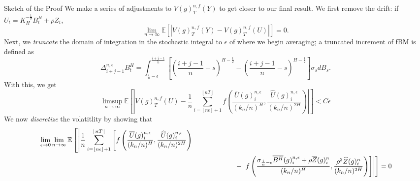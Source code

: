 \documentclass[final,hyperref={pdfpagelabels=false}]{beamer}
\newcommand{\E}{\mathbb{E}}
\begin{document}
\begin{frame}{}
\begin{columns}[t]
\begin{column}{0.4\linewidth}
        \begin{block}{Sketch of the Proof}
          We make a series of adjustments to \(V(g)^{n,f}_T(Y)\) to get closer to our final result. We first remove the drift: if \(U_t = K_H^{-\frac{1}{2}}B^H_t + \rho Z_t\),
          \begin{equation*}
            \lim_{n \rightarrow \infty} \E\left[ \left| V(g)^{n,f}_T(Y) - V(g)^{n,f}_T(U) \right| \right] = 0.
          \end{equation*}
          Next, we \textit{truncate} the domain of integration in the stochastic integral to \(\epsilon\) of where we begin averaging; a truncated increment of fBM is defined as
          \begin{equation*}
            \Delta_{i+j-1}^{n,\epsilon} B^H_t =  \int_{\frac{i}{n}-\epsilon}^{\frac{i+j-1}{n}} \left[ \left( \frac{i+j-1}{n} -s \right)^{H - \frac{1}{2}} - \left( \frac{i+j-1}{n} -s \right)^{H - \frac{1}{2}} \right]\sigma_s dB_s.
          \end{equation*}
          With this, we get
          \begin{equation*}
            \limsup_{n \rightarrow \infty} \E \left[ \left| V(g)^{n,f}_T(U) - \frac{1}{n}\sum_{i=\left\lfloor n\epsilon \right\rfloor + 1}^{\left\lfloor nT \right\rfloor} f\left( \frac{\overline{U}(g)^{n,\epsilon}_i}{(k_n/n)^H}, \frac{\widehat{U}(g)^{n,\epsilon}_i}{(k_n/n)^{2H}} \right) \right| \right] < C\epsilon
          \end{equation*}
          We now \textit{discretize} the volatitlity by showing that
          \begin{align*}
            \phantom{}
            \begin{aligned}
      &\lim_{\epsilon \rightarrow 0}\lim_{n \rightarrow \infty}\E \left[ \left| \frac{1}{n}\sum_{i=\left\lfloor n\epsilon \right\rfloor + 1}^{\left\lfloor nT \right\rfloor} \left[ f\left( \frac{\overline{U}(g)^{n,\epsilon}_i}{(k_n/n)^H}, \frac{\widehat{U}(g)^{n,\epsilon}_i}{(k_n/n)^{2H}} \right) \right. \right. \right. \\
      & \hspace*{10cm} - \left. \left. \left. f\left( \frac{\sigma_{\frac{i}{n}-\epsilon}\overline{B^H}(g)^{n,\epsilon}_i + \rho\overline{Z}(g)^n_i}{(k_n/n)^{H}}, \frac{\rho^2\widehat{Z}(g)^n_i}{(k_n/n)^{2H}}\right) \right] \right| \right] = 0
            \end{aligned}
          \end{align*}
        \end{block}
      \end{column}


\end{columns}
\end{frame}
\end{document}
